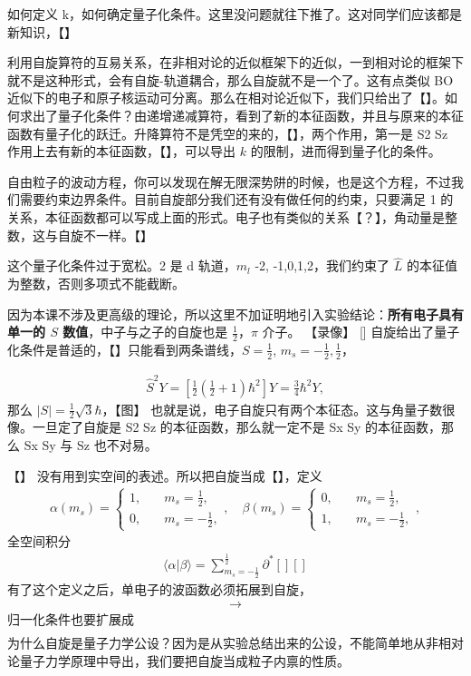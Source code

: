 如何定义 k，如何确定量子化条件。这里没问题就往下推了。这对同学们应该都是新知识，【】

利用自旋算符的互易关系，在非相对论的近似框架下的近似，一到相对论的框架下就不是这种形式，会有自旋-轨道耦合，那么自旋就不是一个了。这有点类似 BO 近似下的电子和原子核运动可分离。那么在相对论近似下，我们只给出了【】。如何求出了量子化条件？由递增递减算符，看到了新的本征函数，并且与原来的本征函数有量子化的跃迁。升降算符不是凭空的来的，【】，两个作用，第一是 S2 Sz 作用上去有新的本征函数，【】，可以导出 $k$ 的限制，进而得到量子化的条件。

自由粒子的波动方程，你可以发现在解无限深势阱的时候，也是这个方程，不过我们需要约束边界条件。目前自旋部分我们还有没有做任何的约束，只要满足 {1} 的关系，本征函数都可以写成上面的形式。电子也有类似的关系【？】，角动量是整数，这与自旋不一样。【】

这个量子化条件过于宽松。2 是 d 轨道，$m_l$ -2, -1,0,1,2，我们约束了 $\hat L$ 的本征值为整数，否则多项式不能截断。

因为本课不涉及更高级的理论，所以这里不加证明地引入实验结论：\textbf{所有电子具有单一的 $S$ 数值}，中子与之子的自旋也是 $\frac12$，$\pi$ 介子。
【录像】
[]
自旋给出了量子化条件是普适的，【】只能看到两条谱线，$S = \frac12$, $m_s = -\frac12, \frac12$，

\begin{align}
    \hat S^2 Y = \left[\frac12\left(\frac12 + 1\right)\hbar^2\right] Y  = \frac34 \hbar^2 Y,
\end{align}
那么 $|S| = \frac12 \sqrt3 \hbar$，【图】
也就是说，电子自旋只有两个本征态。这与角量子数很像。一旦定了自旋是 S2 Sz 的本征函数，那么就一定不是 Sx Sy 的本征函数，那么 Sx Sy 与 Sz 也不对易。

【】
没有用到实空间的表述。所以把自旋当成【】，定义
\begin{align}
    \alpha(m_s) = \begin{cases}
        1, \quad & m_s = \frac12, \\
        0, \quad & m_s = -\frac12, 
    \end{cases}, \quad 
    \beta(m_s) = \begin{cases}
        0, \quad & m_s = \frac12, \\
        1, \quad & m_s = -\frac12, 
    \end{cases},  
\end{align}
全空间积分
\begin{align}
\langle \alpha | \beta \rangle = \sum_{m_s = -\frac12}^{\frac12} \partial ^* [][]
\end{align}
有了这个定义之后，单电子的波函数必须拓展到自旋，
\begin{align}
    [] \rightarrow
\end{align}
归一化条件也要扩展成
\begin{align}
    [][]
\end{align}
为什么自旋是量子力学公设？因为是从实验总结出来的公设，不能简单地从非相对论量子力学原理中导出，我们要把自旋当成粒子内禀的性质。

